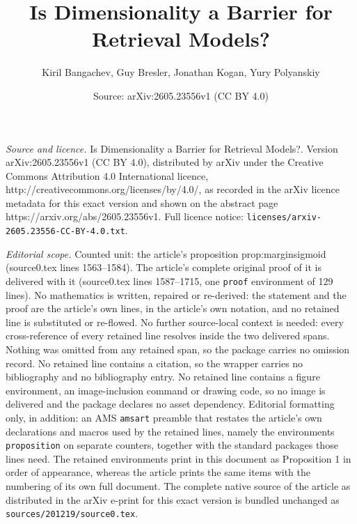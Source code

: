 \documentclass[10pt,a4paper]{amsart}
\title{Is Dimensionality a Barrier for Retrieval Models?}
\author{Kiril Bangachev, Guy Bresler, Jonathan Kogan, Yury Polyanskiy}
\date{Source: arXiv:2605.23556v1 (CC BY 4.0)}
\begin{document}
\maketitle

\noindent\emph{Source and licence.} Is Dimensionality a Barrier for Retrieval Models?. Version arXiv:2605.23556v1 (CC BY 4.0), distributed by arXiv under the Creative Commons Attribution 4.0 International licence, http://creativecommons.org/licenses/by/4.0/, as recorded in the arXiv licence metadata for this exact version and shown on the abstract page https://arxiv.org/abs/2605.23556v1. Full licence notice: \texttt{licenses/arxiv-2605.23556-CC-BY-4.0.txt}.\par\smallskip

\noindent\textit{Editorial scope.} Counted unit: the article's proposition prop:marginsigmoid (source0.tex lines 1563--1584). The article's complete original proof of it is delivered with it (source0.tex lines 1587--1715, one \texttt{proof} environment of 129 lines). No mathematics is written, repaired or re-derived: the statement and the proof are the article's own lines, in the article's own notation, and no retained line is substituted or re-flowed.  No further source-local context is needed: every cross-reference of every retained line resolves inside the two delivered spans.  Nothing was omitted from any retained span, so the package carries no omission record.  No retained line contains a citation, so the wrapper carries no bibliography and no bibliography entry.  No retained line contains a figure environment, an image-inclusion command or drawing code, so no image is delivered and the package declares no asset dependency.  Editorial formatting only, in addition: an AMS \texttt{amsart} preamble that restates the article's own declarations and macros used by the retained lines, namely the environments \texttt{proposition} on separate counters, together with the standard packages those lines need.  The retained environments print in this document as Proposition 1 in order of appearance, whereas the article prints the same items with the numbering of its own full document.  The complete native source of the article as distributed in the arXiv e-print for this exact version is bundled unchanged as \texttt{sources/201219/source0.tex}.
\end{document}
